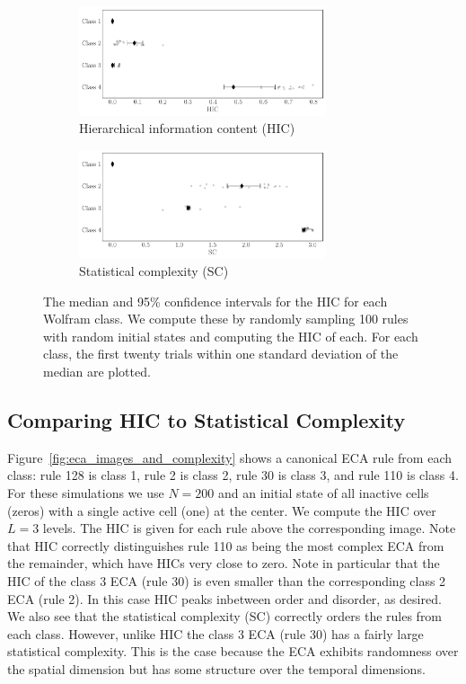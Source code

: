 \begin{figure}[ht!]
\centering
\begin{subfigure}{\textwidth}
    \centering
    \includegraphics[width=0.8\textwidth]{figures/hic_by_class}
    \caption{Hierarchical information content (HIC)}
    \label{fig:hic_by_class}
\end{subfigure}
\begin{subfigure}{\textwidth}
    \centering
    \includegraphics[width=0.8\textwidth]{figures/sc_by_class}
    \caption{Statistical complexity (SC)}
    \label{fig:sc_by_class}
\end{subfigure}
\caption{The median and 95\% confidence intervals for the HIC for each Wolfram
    class. We compute these by randomly sampling 100 rules with random initial
    states and computing the HIC of each. For each class, the first twenty
    trials within one standard deviation of the median are plotted.}
\label{fig:complexity_by_class}
\end{figure}


\subsection{Comparing HIC to Statistical Complexity}

Figure~\ref{fig:eca_images_and_complexity} shows a canonical ECA rule from each
class: rule 128 is class 1, rule 2 is class 2, rule 30 is class 3, and rule 110
is class 4. For these simulations we use $N\!=\!200$ and an initial state of all
inactive cells (zeros) with a single active cell (one) at the center. We
compute the HIC over $L\!=\!3$ levels. The HIC is given for each rule above the
corresponding image. Note that HIC correctly distinguishes rule 110 as being
the most complex ECA from the remainder, which have HICs very close to zero.
Note in particular that the HIC of the class 3 ECA (rule 30) is even smaller
than the corresponding class 2 ECA (rule 2). In this case HIC peaks inbetween
order and disorder, as desired. We also see that the statistical complexity
(SC) correctly orders the rules from each class. However, unlike HIC the class
3 ECA (rule 30) has a fairly large statistical complexity. This is the case
because the ECA exhibits randomness over the spatial dimension but has some
structure over the temporal dimensions.

